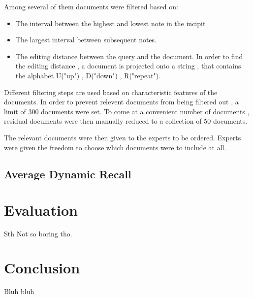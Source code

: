 \documentclass{llncs}
\begin{document}
 		Among several of them documents were filtered based on: 

 		\begin{itemize}
 			\item The interval between the highest and lowest note in the incipit
 			\item The largest interval between subsequent notes.
 			\item The editing distance between the query and the document. In order to find the editing distance , a document is projected onto a string , that contains the alphabet U("up") , D("down") , R("repeat"). 
 		\end{itemize} 

 		Different filtering steps are used based on characteristic features of the documents. In order to prevent relevent documents from being filtered out , a limit of 300 documents were set. To come at a convenient number of documents , residual documents were then manually reduced to a collection of 50 documents.

 		The relevant documents were then given to the experts to be ordered. Experts were given the freedom to choose which documents were to include at all.  


		\subsection{Average Dynamic Recall}







	\section{Evaluation}
		Sth Not so boring tho.

	\section{Conclusion}
		Bluh bluh
		
	
\end{document}
